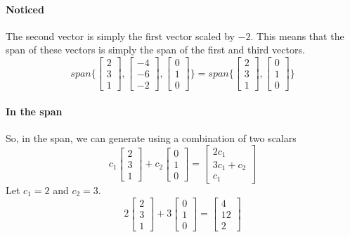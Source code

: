 \documentclass{article}
\begin{document}
        \paragraph{Noticed}
            The second vector is simply the first vector scaled by $-2$.
            This means that the span of these vectors is simply the span of the first and third vectors.
            \[
            span\{\begin{bmatrix}2 \\ 3 \\ 1\end{bmatrix}, \begin{bmatrix}-4 \\ -6 \\ -2\end{bmatrix}, \begin{bmatrix}0 \\ 1 \\ 0\end{bmatrix}\}
            =
            span\{\begin{bmatrix}2 \\ 3 \\ 1\end{bmatrix}, \begin{bmatrix}0 \\ 1 \\ 0\end{bmatrix}\}
            \]
        \paragraph{In the span}
            So, in the span, we can generate using a combination of two scalars
            \[
            c_1\begin{bmatrix}2 \\ 3 \\ 1\end{bmatrix} + c_2\begin{bmatrix}0 \\ 1 \\ 0\end{bmatrix}
            =
            \begin{bmatrix}2c_1 \\ 3c_1 + c_2 \\ c_1\end{bmatrix}
            \]
            Let $c_1 = 2$ and $ c_2 = 3$.
            \[
            2\begin{bmatrix}2 \\ 3 \\ 1\end{bmatrix} + 3\begin{bmatrix}0 \\ 1 \\ 0\end{bmatrix} =
            \begin{bmatrix}4 \\ 12 \\ 2\end{bmatrix}
            \]
\end{document}
